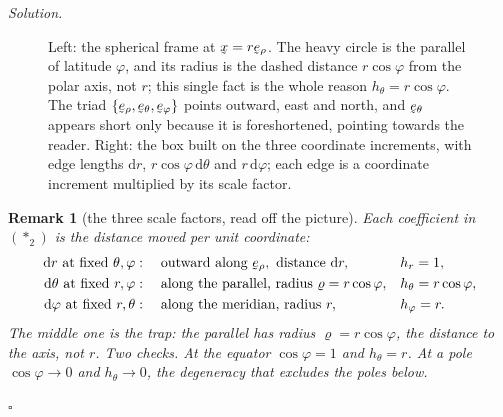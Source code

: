 \documentclass[17pt,a4paper]{extreport}
\DeclareRobustCommand{\vek}[1]{\underaccent{\tilde}{#1}}
\newcommand{\bx}{\vek{x}}
\renewcommand{\beth}{\vek{e}_{\theta}}
\newcommand{\beph}{\vek{e}_{\varphi}}
\newcommand{\berho}{\vek{e}_{\rho}}
\newcommand{\dl}{\mathrm{d}}
\theoremstyle{scplain}
\theoremstyle{scdefn}
\newtheorem{remark}[theorem]{Remark}
\theoremstyle{scplain}
\newenvironment{solution}
 {\par\smallskip\noindent\textit{Solution.}\ }
 {\hfill$\square$\par\medskip}
\begin{document}
\begin{solution}
\begin{figure}[htbp]
{}
\caption{Left: the spherical frame at $\bx=r\berho$. The heavy circle is the
parallel of latitude $\varphi$, and its radius is the dashed distance
$r\cos\varphi$ from the polar axis, not $r$; this single fact is the whole
reason $h_{\theta}=r\cos\varphi$. The triad $\{\berho,\beth,\beph\}$ points
outward, east and north, and $\beth$ appears short only because it is
foreshortened, pointing towards the reader. Right: the box built on the three
coordinate increments, with edge lengths $\dl r$, $r\cos\varphi\,\dl\theta$
and $r\,\dl\varphi$; each edge is a coordinate increment multiplied by its
scale factor.}
\label{fig:sph}
\end{figure}

\begin{remark}[the three scale factors, read off the picture]
\label{rem:sphscale}
Each coefficient in $(\ast_{2})$ is the distance moved per unit
coordinate:
\[
\begin{aligned}
   \dl r\ \text{at fixed }\theta,\varphi&:\quad
     \text{outward along }\berho,\ \text{distance }\dl r,
     &&h_{r}=1,\\
   \dl\theta\ \text{at fixed }r,\varphi&:\quad
     \text{along the parallel, radius }\varrho=r\cos\varphi,
     &&h_{\theta}=r\cos\varphi,\\
   \dl\varphi\ \text{at fixed }r,\theta&:\quad
     \text{along the meridian, radius }r,
     &&h_{\varphi}=r .
\end{aligned}
\]
The middle one is the trap: the parallel has radius $\varrho=r\cos\varphi$,
the distance to the \emph{axis}, not $r$. Two checks. At the equator
$\cos\varphi=1$ and $h_{\theta}=r$. At a pole $\cos\varphi\to0$ and
$h_{\theta}\to0$, the degeneracy that excludes the poles below.
\end{remark}


\end{solution}
\end{document}
